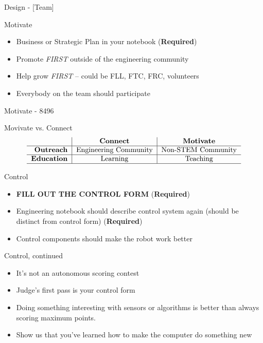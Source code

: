 \documentclass{beamer}
\begin{document}
  \begin{frame}{Design - [Team]}
  \end{frame}

  \begin{frame}{Motivate}
    \begin{itemize}
    \item Business or Strategic Plan in your notebook (\textbf{Required})\pause
    \item Promote \textit{FIRST} outside of the engineering community \pause
    \item Help grow \textit{FIRST} -- could be FLL, FTC, FRC, volunteers \pause
    \item Everybody on the team should participate
    \end{itemize}
  \end{frame}


  \begin{frame}{Motivate - 8496}
  \end{frame}

  \begin{frame}{Movivate vs. Connect}
    \[
    \begin{tabular}{r|c|c}
       & \textbf{Connect} & \textbf{Motivate} \\ \hline
      \textbf{Outreach} & Engineering Community & Non-STEM Community \\ \hline
      \textbf{Education} & Learning & Teaching \\
      \hline
    \end{tabular}
    \]
  \end{frame}

  \begin{frame}{Control}
    \begin{itemize}
    \item \textbf{FILL OUT THE CONTROL FORM} (\textbf{Required})\pause
    \item Engineering notebook should describe control system again \pause
      (should be distinct from control form) (\textbf{Required})\pause
    \item Control components should make the robot work better
    \end{itemize}
  \end{frame}

  \begin{frame}{Control, continued}
    \begin{itemize}
    \item It's not an autonomous scoring contest \pause
    \item Judge's first pass is your control form \pause
    \item Doing something interesting with sensors or algorithms
      is better than always scoring maximum points. \pause
    \item Show us that you've learned how to make the computer do
      something new
    \end{itemize}
  \end{frame}
\end{document}
